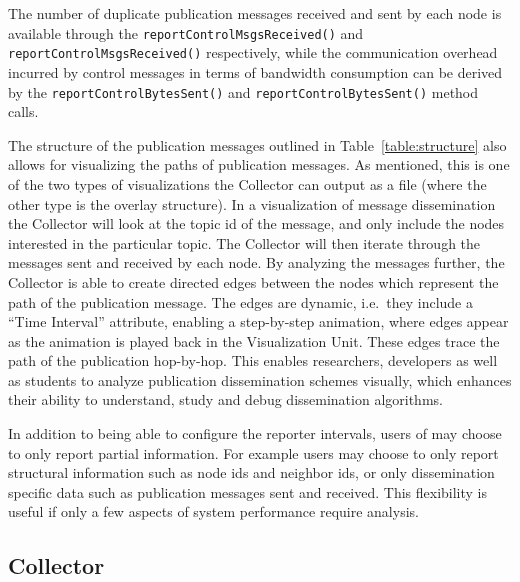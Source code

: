 The number of duplicate publication messages received and sent by each
node is available through the \texttt{reportControlMsgsReceived()}  and
\texttt{reportControlMsgsReceived()} respectively, while the communication
overhead incurred by control messages in terms of bandwidth consumption can be
derived by the \texttt{reportControlBytesSent()} and
\texttt{reportControlBytesSent()} method calls.



The structure of the publication messages outlined in
Table~\ref{table:structure} also allows for visualizing the paths of
publication messages. As mentioned, this is one of the two types of
visualizations the Collector can output as a \gexf{} file (where the
other type is the overlay structure). In a visualization of message
dissemination the Collector will look at the topic id of the message,
and only include the nodes interested in the particular topic. The
Collector will then iterate through the messages sent and received by
each node.  By analyzing the messages further, the Collector is able to
create directed edges between the nodes which represent the path of the
publication message. The edges are dynamic, i.e.\ they include a ``Time
Interval'' attribute, enabling a step-by-step animation, where edges
appear as the animation is played back in the Visualization Unit. These
edges trace the path of the publication hop-by-hop. This enables
researchers, developers as well as students to analyze publication
dissemination schemes visually, which enhances their ability to
understand, study and debug dissemination algorithms.

In addition to being able to configure the reporter intervals, users of
\demo{} may choose to only report partial information. For example users
may choose to only report structural information such as node ids and
neighbor ids, or only dissemination specific data such as publication
messages sent and received. This flexibility is useful if only a few
aspects of system performance require analysis.

\subsection{Collector}
\label{sec:collector}

